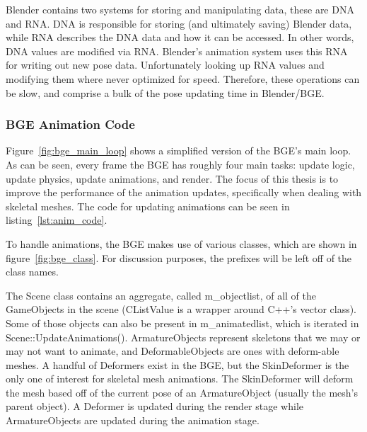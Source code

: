 Blender contains two systems for storing and manipulating data, these are DNA and RNA. DNA is responsible for storing (and ultimately saving) Blender data, while RNA describes the DNA data and how it can be accessed.
In other words, DNA values are modified via RNA.
Blender's animation system uses this RNA for writing out new pose data.
Unfortunately looking up RNA values and modifying them where never optimized for speed.
Therefore, these operations can be slow, and comprise a bulk of the pose updating time in Blender/BGE.


\subsubsection{BGE Animation Code}
\label{sec:bge_overview}


Figure~\ref{fig:bge_main_loop} shows a simplified version of the BGE's main loop.
As can be seen, every frame the BGE has roughly four main tasks: update logic, update physics, update animations, and render.
The focus of this thesis is to improve the performance of the animation updates, specifically when dealing with skeletal meshes.
The code for updating animations can be seen in listing~\ref{lst:anim_code}.


To handle animations, the BGE makes use of various classes, which are shown in figure~\ref{fig:bge_class}.
For discussion purposes, the prefixes will be left off of the class names.


The Scene class contains an aggregate, called m\_objectlist, of all of the GameObjects in the scene (CListValue is a wrapper around C++'s vector class).
Some of those objects can also be present in m\_animatedlist, which is iterated in Scene::UpdateAnimations().
ArmatureObjects represent skeletons that we may or may not want to animate, and DeformableObjects are ones with deform-able meshes.
A handful of Deformers exist in the BGE, but the SkinDeformer is the only one of interest for skeletal mesh animations.
The SkinDeformer will deform the mesh based off of the current pose of an ArmatureObject (usually the mesh's parent object).
A Deformer is updated during the render stage while ArmatureObjects are updated during the animation stage.

